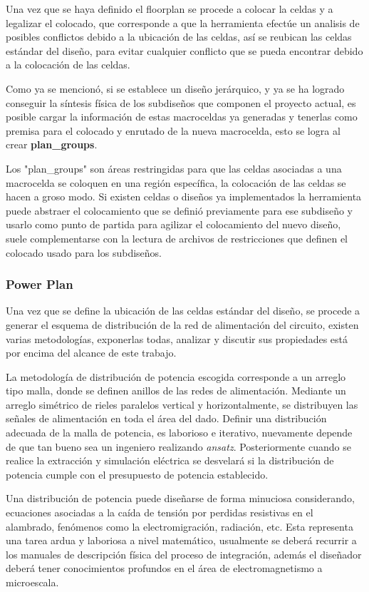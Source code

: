 Una vez que se haya definido el floorplan se procede a colocar la celdas y a legalizar el colocado, que corresponde a que la herramienta 
efectúe un analisis de posibles conflictos debido a la ubicación de las celdas, así se reubican las celdas estándar del diseño, para evitar cualquier conflicto que se pueda encontrar debido a la colocación de las celdas.

Como ya se mencionó, si se establece un diseño jerárquico, y ya se ha logrado conseguir la síntesis física de los subdiseños que componen el proyecto actual, es posible cargar la información de estas macroceldas ya generadas y tenerlas como premisa para el colocado y enrutado de la nueva macrocelda, esto se logra al crear \textbf{plan\_groups}.

Los "plan\_groups" son áreas restringidas para que las celdas asociadas a una macrocelda se coloquen en una región específica, la colocación de las celdas se hacen a groso modo. Si existen celdas o diseños ya implementados la herramienta puede abstraer el colocamiento que se definió previamente para ese subdiseño y usarlo como punto de partida para agilizar el colocamiento del nuevo diseño, suele complementarse con la lectura de archivos de restricciones que definen el colocado usado para los subdiseños.

\subsubsection{Power Plan}

Una vez que se define la ubicación de las celdas estándar del diseño, se procede a generar el esquema de distribución de la red de alimentación del circuito, existen varias metodologías, exponerlas todas, analizar y discutir sus propiedades está por encima del alcance de este trabajo.

La metodología de distribución de potencia escogida corresponde a un arreglo tipo malla, donde se definen anillos de las redes de alimentación. Mediante un arreglo simétrico de rieles paralelos vertical y horizontalmente, se distribuyen las señales de alimentación en toda el área del dado. Definir una distribución adecuada de la malla de potencia, es laborioso e iterativo, nuevamente depende de que tan bueno sea un ingeniero realizando \textit{ansatz}. Posteriormente cuando se realice la extracción y simulación eléctrica se desvelará si la distribución de potencia cumple con el presupuesto de potencia establecido.

Una distribución de potencia puede diseñarse de forma minuciosa considerando, ecuaciones asociadas a la caída de tensión por perdidas resistivas en el alambrado, fenómenos como la electromigración, radiación, etc. Esta representa una tarea ardua y laboriosa a nivel matemático, usualmente se deberá recurrir a los manuales de descripción física del proceso de integración, además el diseñador deberá tener conocimientos profundos en el área de electromagnetismo a microescala.

